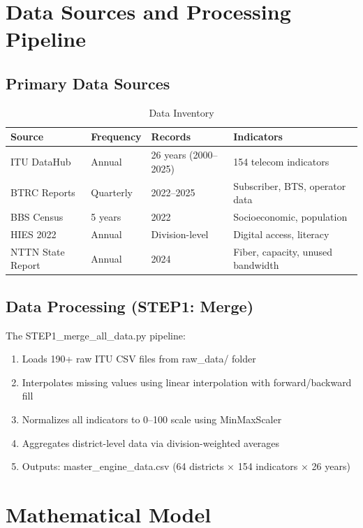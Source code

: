 \documentclass[11pt,a4paper]{article}
\begin{document}
\section{Data Sources and Processing Pipeline}

\subsection{Primary Data Sources}

\begin{table}[h]
\centering
\caption{Data Inventory}
\begin{tabular}{|l|l|l|l|}
\hline
\textbf{Source} & \textbf{Frequency} & \textbf{Records} & \textbf{Indicators} \\
\hline
ITU DataHub & Annual & 26 years (2000–2025) & 154 telecom indicators \\
BTRC Reports & Quarterly & 2022–2025 & Subscriber, BTS, operator data \\
BBS Census & 5 years & 2022 & Socioeconomic, population \\
HIES 2022 & Annual & Division-level & Digital access, literacy \\
NTTN State Report & Annual & 2024 & Fiber, capacity, unused bandwidth \\
\hline
\end{tabular}
\end{table}

\subsection{Data Processing (STEP1: Merge)}
The STEP1\_merge\_all\_data.py pipeline:
\begin{enumerate}
  \item Loads 190+ raw ITU CSV files from raw\_data/ folder
  \item Interpolates missing values using linear interpolation with forward/backward fill
  \item Normalizes all indicators to 0–100 scale using MinMaxScaler
  \item Aggregates district-level data via division-weighted averages
  \item Outputs: master\_engine\_data.csv (64 districts × 154 indicators × 26 years)
\end{enumerate}

\section{Mathematical Model}
\end{document}
